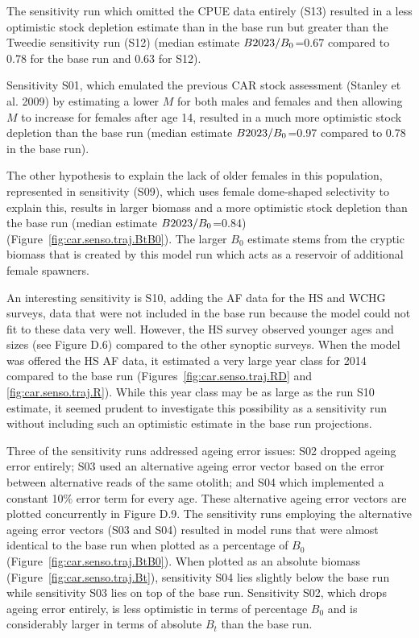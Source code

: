 \documentclass[11pt]{book}
\newcommand{\pc}{\%}
\begin{document}
The sensitivity run which omitted the CPUE data entirely (S13) resulted in a less optimistic stock depletion estimate than in the base run but greater than the Tweedie sensitivity run (S12) (median estimate $B2023/B_0$=0.67 compared to 0.78 for the base run and 0.63 for S12).

Sensitivity S01, which emulated the previous CAR stock assessment (Stanley et al. 2009) by estimating a lower $M$ for both males and females and then allowing $M$ to increase for females after age 14, resulted in a much more optimistic stock depletion than the base run (median estimate $B2023/B_0$=0.97 compared to 0.78 in the base run).

The other hypothesis to explain the lack of older females in this population, represented in sensitivity (S09), which uses female dome-shaped selectivity to explain this, results in larger biomass and a more optimistic stock depletion than the base run (median estimate $B2023/B_0$=0.84) (Figure~\ref{fig:car.senso.traj.BtB0}).
The larger $B_0$ estimate stems from the cryptic biomass that is created by this model run which  acts as a reservoir of additional female spawners.

An interesting sensitivity is S10, adding the AF data for the HS and WCHG surveys, data that were not included in the base run because the model could not fit to these data very well.
However, the HS survey observed younger ages and sizes (see Figure D.6) compared to the other synoptic surveys.
When the model was offered the HS AF data, it estimated a very large year class for 2014 compared to the base run (Figures~\ref{fig:car.senso.traj.RD} and \ref{fig:car.senso.traj.R}).
While this year class may be as large as the run S10 estimate, it seemed prudent to investigate this possibility as a sensitivity run without including such an optimistic estimate in the base run projections.

Three of the sensitivity runs addressed ageing error issues: S02 dropped ageing error entirely; S03 used an alternative ageing error vector based on the error between alternative reads of the same otolith; and S04 which implemented a constant 10\pc{} error term for every age.
These alternative ageing error vectors are plotted concurrently in Figure D.9.
The sensitivity runs employing the alternative ageing error vectors (S03 and S04) resulted in model runs that were almost identical to the base run when plotted as a percentage of $B_0$ (Figure~\ref{fig:car.senso.traj.BtB0}).
When plotted as an absolute biomass (Figure~\ref{fig:car.senso.traj.Bt}), sensitivity S04 lies slightly below the base run while sensitivity S03 lies on top of the base run.
Sensitivity S02, which drops ageing error entirely, is less optimistic in terms of percentage $B_0$ and is considerably larger in terms of absolute $B_t$ than the base run.
\end{document}
